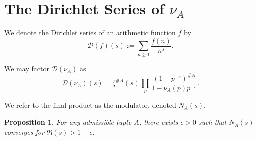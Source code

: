 \documentclass[11pt, leqno]{article}
\newtheorem{proposition}[theorem]{Proposition}
\newcommand{\Di}{\mathcal{D}}
\begin{document}
\section{The Dirichlet Series of $\nu_A$}

We denote the Dirichlet series of an arithmetic function $f$ by
$$\Di(f)(s) := \sum_{n\ge 1}\frac{f(n)}{n^{s}}.$$

We may factor $\Di(\nu_A)$ as
\begin{equation}\label{DUA zeta form}
\Di(\nu_A)(s) = \zeta^{\#A}(s)  
    \prod_{p}\frac{(1-p^{-s})^{\#A}}{1-\nu_A(p)p^{-s}}.
\end{equation}

We refer to the final product as the modulator, denoted $N_A(s)$.

\begin{proposition}
    For any admissible tuple $A$, there exists $\epsilon > 0$
    such that $N_A(s)$ converges for $\Re(s) > 1-\epsilon$.
\end{proposition}
\end{document}
